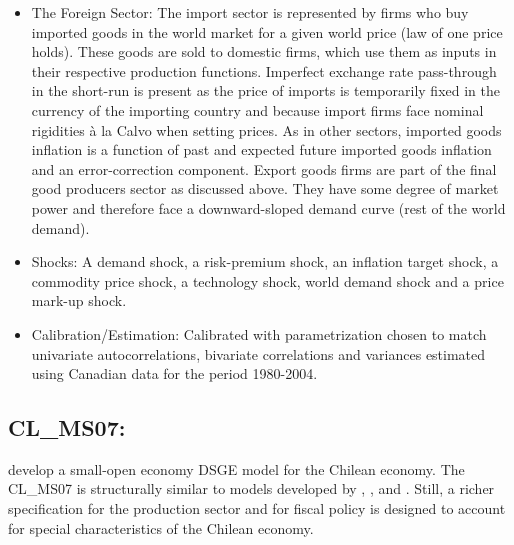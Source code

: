 \documentclass[11pt,a4paper]{article}
\begin{document}
\begin{itemize}
		\item The Foreign Sector: The import sector is represented by firms who buy imported goods in the world market for a given world price (law of one price holds). These goods are sold to domestic firms, which use them as inputs in their respective production functions. Imperfect exchange rate pass-through in the short-run is present as the price of imports is temporarily fixed in the currency of the importing country and because import firms face nominal rigidities \`{a} la Calvo when setting prices. As in other sectors, imported goods inflation is a function of past and expected future imported goods inflation and an error-correction component. Export goods firms are part of the final good producers sector as discussed above. They have some degree of market power and therefore face a downward-sloped demand curve (rest of the world demand).
		
		
		\item Shocks: A demand shock, a risk-premium shock, an inflation target shock, a commodity price shock, a technology shock, world demand shock and a price mark-up shock.
		
		\item Calibration/Estimation: Calibrated with parametrization chosen to match univariate autocorrelations, bivariate correlations and variances estimated using Canadian data for the period 1980-2004.
		
	\end{itemize}
	
	
	
	
	\subsection{CL\_MS07: \cite{MedinaSoto2007}}
	\label{CLMS07}
	\cite{MedinaSoto2007} develop a small-open economy DSGE model for the Chilean economy. The CL\_MS07 is structurally similar to models developed by \cite{ChristianoEichenbaumEvans2005}, \cite{AltigChristianoEichenbaumLinde2005}, and \cite{SmetsWouters2007}. Still, a richer specification for the production sector and for fiscal policy is designed to account for special characteristics of the Chilean economy.
	
\end{document}

